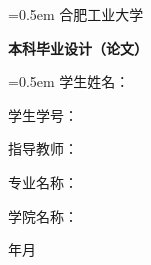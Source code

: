 \begin{titlepage}
\centering

{
\parskip=0.5em
\linespread{1.25}
\LARGE \heiti
合\hspace{1.5em}肥\hspace{1.5em}工\hspace{1.5em}业\hspace{1.5em}大\hspace{1.5em}学\vspace{2.95cm}

\bfseries{本科毕业设计（论文）}\vspace{2cm}

\songti \bfseries{\titleCn} \vspace{6cm}
}

{
\parskip=0.5em \linespread{1.5}
\songti \sanhao
学生姓名：\underlineFixlen[8.8cm]{\studentNameCn}

学生学号：\underlineFixlen[8.8cm]{\studentID}

指导教师：\underlineFixlen[8.8cm]{\supervisor}

专业名称：\underlineFixlen[8.8cm]{\major}

学院名称：\underlineFixlen[8.8cm]{\department}

\vspace{3.2cm}
\large
\finishedYear 年\finishedMonth 月
}


\end{titlepage}
